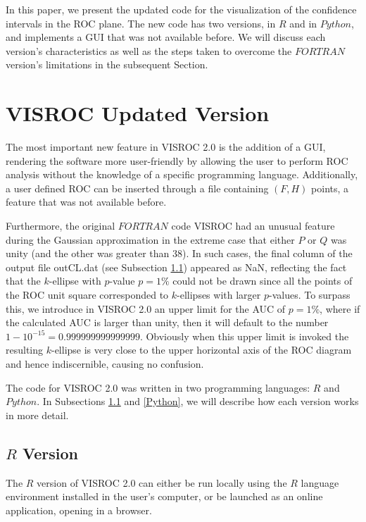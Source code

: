 \documentclass[preprint,12pt]{elsarticle}
\begin{document}
In this paper, we present the updated code for the visualization of the confidence
intervals in the ROC plane. The new code has two versions, in $R$ and in $Python$, and implements a GUI that was not available before. We will discuss each version's characteristics as well as the steps taken to overcome the $FORTRAN$ version's limitations in the subsequent Section.

\section{VISROC Updated Version}

The most important new feature in VISROC 2.0 is the addition of a GUI, rendering the software more user-friendly by allowing the user to perform ROC analysis without the knowledge of a specific programming language. Additionally,  a 
user defined ROC can be inserted through a file containing $(F,H)$ points, a feature that was not available before.

Furthermore, the original $FORTRAN$ code VISROC had an unusual feature during the Gaussian approximation in the extreme case that either $P$ or $Q$ was unity (and the other was greater than $38$). In such cases, the final column of the output file outCL.dat (see Subsection \ref{R}) appeared as NaN, reflecting the fact that the $k$-ellipse with $p$-value $p=1\%$ could not be drawn since all the points of the ROC unit square  corresponded to $k$-ellipses with larger $p$-values.
 To surpass this, we introduce in VISROC 2.0 an upper limit for the AUC of $p=1\%$, where if the calculated AUC is larger than unity, then it will default to the number $1-10^{-15}=0.999999999999999$. Obviously when this upper limit is invoked the resulting $k$-ellipse is very close to the upper horizontal axis of the ROC diagram and hence indiscernible, causing no confusion.  

The code for VISROC 2.0 was written in two programming languages: $R$ and $Python$. In Subsections \ref{R} and \ref{Python}, we will describe how each version works in more detail.

\subsection{$R$ Version}\label{R}

The $R$ version of VISROC 2.0 can either be run locally using the $R$ language environment installed in the user's computer, or be launched as an online application, opening in a browser.
\end{document}
